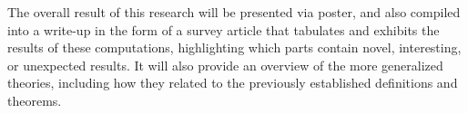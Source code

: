 \documentclass[normal]{aomart}
\newtheorem[{}\it]{thm}{Theorem}[section]
\theoremstyle{definition}
\newtheorem*[{}\it]{notation}{Notation}
\begin{document}
The overall result of this research will be presented via poster, and also compiled into a write-up in the form of a survey article that tabulates and exhibits the results of these computations, highlighting which parts contain novel, interesting, or unexpected results. It will also provide an overview of the more generalized theories, including how they related to the previously established definitions and theorems.

\newpage


\end{document}
